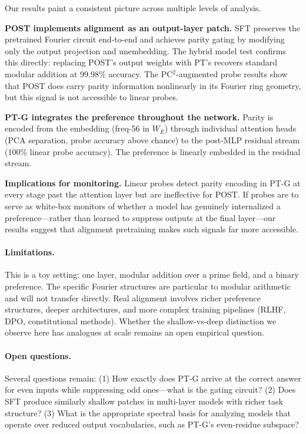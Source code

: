 \documentclass[10pt, letterpaper]{article}
\begin{document}
Our results paint a consistent picture across multiple levels of analysis.

\textbf{POST implements alignment as an output-layer patch.} SFT preserves the pretrained Fourier circuit end-to-end and achieves parity gating by modifying only the output projection and unembedding. The hybrid model test confirms this directly: replacing POST's output weights with PT's recovers standard modular addition at 99.98\% accuracy. The PC$^2$-augmented probe results show that POST does carry parity information nonlinearly in its Fourier ring geometry, but this signal is not accessible to linear probes.

\textbf{PT-G integrates the preference throughout the network.} Parity is encoded from the embedding (freq-56 in $W_E$) through individual attention heads (PCA separation, probe accuracy above chance) to the post-MLP residual stream (100\% linear probe accuracy). The preference is linearly embedded in the residual stream.

\textbf{Implications for monitoring.} Linear probes detect parity encoding in PT-G at every stage past the attention layer but are ineffective for POST. If probes are to serve as white-box monitors of whether a model has genuinely internalized a preference---rather than learned to suppress outputs at the final layer---our results suggest that alignment pretraining makes such signals far more accessible.

\paragraph{Limitations.}
This is a toy setting: one layer, modular addition over a prime field, and a binary preference. The specific Fourier structures are particular to modular arithmetic and will not transfer directly. Real alignment involves richer preference structures, deeper architectures, and more complex training pipelines (RLHF, DPO, constitutional methods). Whether the shallow-vs-deep distinction we observe here has analogues at scale remains an open empirical question.

\paragraph{Open questions.}
Several questions remain: (1) How exactly does PT-G arrive at the correct answer for even inputs while suppressing odd ones---what is the gating circuit? (2) Does SFT produce similarly shallow patches in multi-layer models with richer task structure? (3) What is the appropriate spectral basis for analyzing models that operate over reduced output vocabularies, such as PT-G's even-residue subspace?
\end{document}
